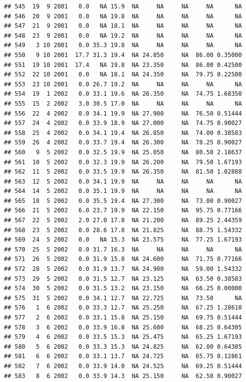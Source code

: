 \documentclass[
]{book}
\begin{document}
\begin{verbatim}
## 545  19  9 2001   0.0   NA 15.9  NA     NA     NA     NA      NA
## 546  20  9 2001   0.0   NA 19.8  NA     NA     NA     NA      NA
## 547  21  9 2001   0.0   NA 18.1  NA     NA     NA     NA      NA
## 548  23  9 2001   0.0   NA 19.2  NA     NA     NA     NA      NA
## 549   3 10 2001   0.0 35.3 19.8  NA     NA     NA     NA      NA
## 550   9 10 2001  17.7 31.3 19.4  NA 24.850     NA  86.00 0.35000
## 551  19 10 2001  17.4   NA 19.8  NA 23.350     NA  86.00 0.42500
## 552  22 10 2001   0.0   NA 18.1  NA 24.350     NA  79.75 0.22500
## 553  23 10 2001   0.0 26.7 19.2  NA     NA     NA     NA      NA
## 554  19  1 2002   0.0 33.1 19.6  NA 26.350     NA  74.75 1.68350
## 555  15  2 2002   3.0 30.5 17.0  NA     NA     NA     NA      NA
## 556  22  4 2002   0.0 34.1 19.9  NA 27.900     NA  76.50 0.51444
## 557  24  4 2002   0.0 33.9 18.9  NA 27.000     NA  74.75 0.90027
## 558  25  4 2002   0.0 34.1 19.4  NA 26.850     NA  74.00 0.38583
## 559  26  4 2002   0.0 33.7 19.4  NA 26.300     NA  78.25 0.90027
## 560   9  5 2002   0.0 32.5 19.9  NA 25.050     NA  80.50 2.18637
## 561  10  5 2002   0.0 32.3 19.9  NA 26.200     NA  79.50 1.67193
## 562  11  5 2002   0.0 33.5 19.9  NA 26.350     NA  81.50 1.02888
## 563  12  5 2002   0.0 34.1 19.9  NA     NA     NA     NA      NA
## 564  14  5 2002   0.0 35.1 19.9  NA     NA     NA     NA      NA
## 565  18  5 2002   0.0 35.5 19.4  NA 27.300     NA  73.00 0.90027
## 566  21  5 2002   6.0 23.7 19.9  NA 22.150     NA  95.75 0.77166
## 567  22  5 2002   2.0 27.0 17.8  NA 21.200     NA  89.25 2.44359
## 568  23  5 2002   0.0 28.6 17.8  NA 21.825     NA  88.75 1.54332
## 569  24  5 2002   0.0   NA 15.3  NA 23.575     NA  77.25 1.67193
## 570  25  5 2002   0.0 31.7 16.3  NA     NA     NA     NA      NA
## 571  26  5 2002   0.0 31.9 15.8  NA 24.600     NA  71.75 0.77166
## 572  28  5 2002   0.0 31.9 13.7  NA 24.900     NA  59.00 1.54332
## 573  29  5 2002   0.0 31.5 12.7  NA 23.125     NA  63.50 0.38583
## 574  30  5 2002   0.0 31.5 13.2  NA 23.150     NA  66.25 0.00000
## 575  31  5 2002   0.0 34.1 12.7  NA 22.725     NA  73.50      NA
## 576   1  6 2002   0.0 33.3 12.7  NA 25.250     NA  67.25 1.28610
## 577   2  6 2002   0.0 33.1 15.8  NA 25.150     NA  69.75 0.51444
## 578   3  6 2002   0.0 33.9 16.8  NA 25.600     NA  68.25 0.64305
## 579   4  6 2002   0.0 33.5 15.3  NA 25.475     NA  65.25 1.67193
## 580   5  6 2002   0.0 33.3 15.3  NA 24.825     NA  62.00 0.64305
## 581   6  6 2002   0.0 33.1 13.7  NA 24.725     NA  65.75 0.12861
## 582   7  6 2002   0.0 33.9 14.0  NA 24.525     NA  69.25 0.51444
## 583   8  6 2002   0.0 33.9 14.3  NA 25.150     NA  62.50 0.90027

\end{verbatim}
\end{document}
